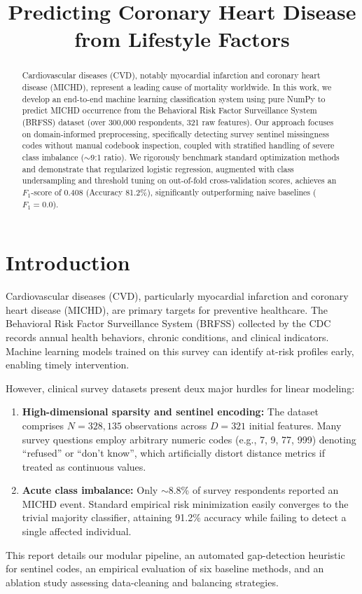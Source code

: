\documentclass[10pt,conference,compsocconf]{IEEEtran}
\title{Predicting Coronary Heart Disease from Lifestyle Factors}
\author{\IEEEauthorblockN{Isaure Imberton, Laetitia Espinosa, Lila Reinhardt}
\IEEEauthorblockA{ EPFL, Switzerland}}
\begin{document}
\maketitle
 
\begin{abstract}
    Cardiovascular diseases (CVD), notably myocardial infarction and coronary heart disease (MICHD), represent a leading cause of mortality worldwide. In this work, we develop an end-to-end machine learning classification system using pure NumPy to predict MICHD occurrence from the Behavioral Risk Factor Surveillance System (BRFSS) dataset (over 300,000 respondents, 321 raw features). Our approach focuses on domain-informed preprocessing, specifically detecting survey sentinel missingness codes without manual codebook inspection, coupled with stratified handling of severe class imbalance ($\sim$9:1 ratio). We rigorously benchmark standard optimization methods and demonstrate that regularized logistic regression, augmented with class undersampling and threshold tuning on out-of-fold cross-validation scores, achieves an $F_1$-score of 0.408 (Accuracy 81.2\%), significantly outperforming naive baselines ($F_1 = 0.0$).
\end{abstract}
 
\section{Introduction}
Cardiovascular diseases (CVD), particularly myocardial infarction and coronary heart disease (MICHD), are primary targets for preventive healthcare. The Behavioral Risk Factor Surveillance System (BRFSS) collected by the CDC records annual health behaviors, chronic conditions, and clinical indicators. Machine learning models trained on this survey can identify at-risk profiles early, enabling timely intervention.
 
However, clinical survey datasets present deux major hurdles for linear modeling:
\begin{enumerate}
    \item \textbf{High-dimensional sparsity and sentinel encoding:} The dataset comprises $N=328{,}135$ observations across $D=321$ initial features. Many survey questions employ arbitrary numeric codes (e.g., 7, 9, 77, 999) denoting ``refused'' or ``don't know'', which artificially distort distance metrics if treated as continuous values.
    \item \textbf{Acute class imbalance:} Only $\sim$8.8\% of survey respondents reported an MICHD event. Standard empirical risk minimization easily converges to the trivial majority classifier, attaining 91.2\% accuracy while failing to detect a single affected individual.
\end{enumerate}
This report details our modular pipeline, an automated gap-detection heuristic for sentinel codes, an empirical evaluation of six baseline methods, and an ablation study assessing data-cleaning and balancing strategies.
 
\end{document}
